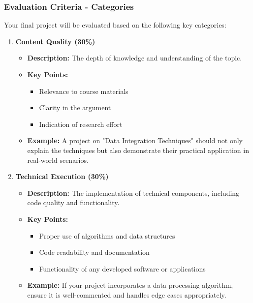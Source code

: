 \documentclass[aspectratio=169]{beamer}
\begin{document}
\begin{frame}[fragile]
  \frametitle{Evaluation Criteria - Categories}
  Your final project will be evaluated based on the following key categories:

  \begin{enumerate}
    \item \textbf{Content Quality (30\%)}
    \begin{itemize}
      \item \textbf{Description:} The depth of knowledge and understanding of the topic.
      \item \textbf{Key Points:}
      \begin{itemize}
        \item Relevance to course materials
        \item Clarity in the argument
        \item Indication of research effort
      \end{itemize}
      \item \textbf{Example:} A project on "Data Integration Techniques" should not only explain the techniques but also demonstrate their practical application in real-world scenarios.
    \end{itemize}

    \item \textbf{Technical Execution (30\%)}
    \begin{itemize}
      \item \textbf{Description:} The implementation of technical components, including code quality and functionality.
      \item \textbf{Key Points:}
      \begin{itemize}
        \item Proper use of algorithms and data structures
        \item Code readability and documentation
        \item Functionality of any developed software or applications
      \end{itemize}
      \item \textbf{Example:} If your project incorporates a data processing algorithm, ensure it is well-commented and handles edge cases appropriately.
    \end{itemize}
  \end{enumerate}
\end{frame}
\end{document}
